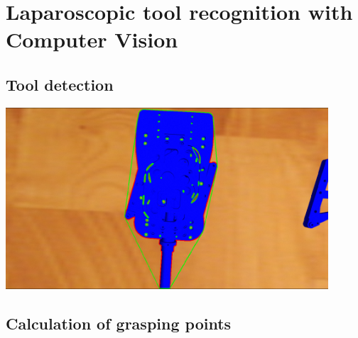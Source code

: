 \section{Laparoscopic tool recognition with Computer Vision}

\subsection{Tool detection}

\begin{center}
\includegraphics[width=12cm]{images/opencv-tool-convex-hull.png}\\[1cm]
\end{center}

\subsection{Calculation of grasping points}